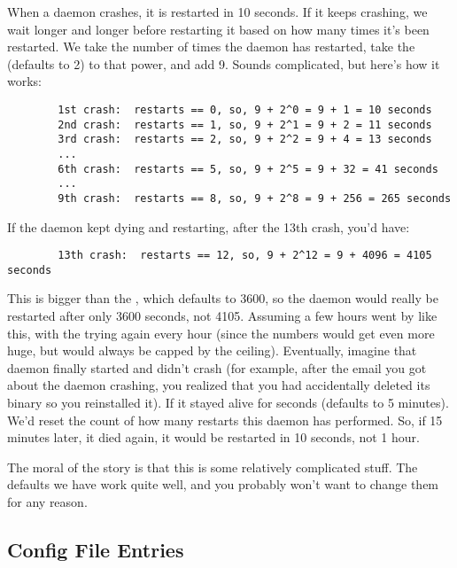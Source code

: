 When a daemon crashes, it is restarted in 10 seconds.  If it keeps
crashing, we wait longer and longer before restarting it based on how
many times it's been restarted.  We take the number of times the
daemon has restarted, take the 
(defaults to 2) to that power, and add 9.  Sounds complicated, but
here's how it works:

\begin{verbatim}
        1st crash:  restarts == 0, so, 9 + 2^0 = 9 + 1 = 10 seconds
        2nd crash:  restarts == 1, so, 9 + 2^1 = 9 + 2 = 11 seconds
        3rd crash:  restarts == 2, so, 9 + 2^2 = 9 + 4 = 13 seconds
        ...
        6th crash:  restarts == 5, so, 9 + 2^5 = 9 + 32 = 41 seconds
        ...
        9th crash:  restarts == 8, so, 9 + 2^8 = 9 + 256 = 265 seconds
\end{verbatim}

If the daemon kept dying and restarting, after the 13th crash, you'd
have:

\begin{verbatim}
        13th crash:  restarts == 12, so, 9 + 2^12 = 9 + 4096 = 4105 seconds
\end{verbatim}

This is bigger than the , which
defaults to 3600, so the daemon would really be restarted after only
3600 seconds, not 4105.  Assuming a few hours went by like this, with
the  trying again every hour (since the numbers would
get even more huge, but would always be capped by the ceiling).
Eventually, imagine that daemon finally started and didn't crash (for
example, after the email you got about the daemon crashing, you
realized that you had accidentally deleted its binary so you
reinstalled it).  If it stayed alive for
 seconds (defaults to 5 minutes).  We'd
reset the count of how many restarts this daemon has performed.  So,
if 15 minutes later, it died again, it would be restarted in 10
seconds, not 1 hour.

The moral of the story is that this is some relatively complicated
stuff.  The defaults we have work quite well, and you probably 
won't want to change them for any reason.


\subsection{ Config File Entries}
\label{sec:Startd-Config-File-Entries}

